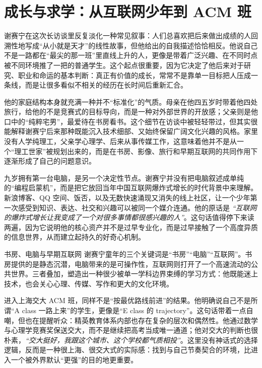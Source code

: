 \section{成长与求学：从互联网少年到 ACM 班}

谢赛宁在这次长访谈里反复淡化一种常见叙事：人们总喜欢把后来做出成绩的人回溯性地写成“从小就是天才”的线性故事，但他给出的自我描述恰恰相反。他说自己不是一路都在“最尖的那一班”里直线上升的人，更像是带着广泛兴趣、在不同时点被不同环境推了一把的普通学生。这个起点很重要，因为它决定了他后来对于研究、职业和命运的基本判断：真正有价值的成长，常常不是靠单一目标把人压成一条线，而是让很多看似不相关的经历在长时间后重新汇合。

他的家庭结构本身就充满一种并不“标准化”的气质。母亲在他四五岁时带着他四处旅行，给他的不是竞赛式的目标导向，而是一种对外部世界的开放感；父亲则是他口中的“纯粹宅男”，最爱待在书房看书。这个细节在访谈中被轻轻带过，但其实很能解释谢赛宁后来那种既能沉入技术细部、又始终保留广阔文化兴趣的风格。家里没有人学纯理工，父亲学心理学、后来从事传媒工作，这意味着他并不是从一个“理工世家”被规划出来的，而是在书房、影像、旅行和早期互联网的共同作用下逐渐形成了自己的问题意识。

九岁拥有第一台电脑，是另一个决定性节点。谢赛宁并没有把电脑叙述成单纯的“编程启蒙机”，而是把它放回当年中国互联网爆炸式增长的时代背景中来理解。新浪博客、QQ 空间、饭否，以及无数快速涌现又消失的线上社区，让一个少年第一次感受到知识、表达、社交和兴趣可以被同一个媒介连通。他的原话是 \textit{``互联网的爆炸式增长让我变成了一个对很多事情都很感兴趣的人''}。这句话值得停下来读两遍，因为它说明他的核心资产并不是过早专业化，而是过早接触了一个高度异质的信息世界，从而建立起持久的好奇心机制。

\begin{knowledgebox}{书房、电脑与早期互联网}
谢赛宁童年的三个关键词是“书房”“电脑”“互联网”。书房提供的是静态沉潜，电脑带来的是可操作性，互联网则打开了一个高速流动的公共世界。三者叠加，塑造出一种很少被单一学科边界束缚的学习方式：他既能迷上技术，也会关心心理、传媒、写作和更大的文化环境。
\end{knowledgebox}

进入上海交大 ACM 班，同样不是“按最优路线前进”的结果。他明确说自己不是所谓“A class 一路上来”的学生，更像是“E class 的 trajectory”。这句话带着一点自嘲，但也在提醒听众：精英教育体系内部也存在复杂的层次和偶然性。他通过数学与心理学竞赛奖保送交大，而不是继续把高考当成唯一通道；他对交大的判断也很朴素，\textit{``交大挺好，我跟这个城市、这个学校都气质相投''}。这里没有神话式的选择逻辑，反而是一种很上海、很交大式的实际感：找到与自己节奏契合的环境，比进入一个被外界默认“更强”的目的地更重要。

